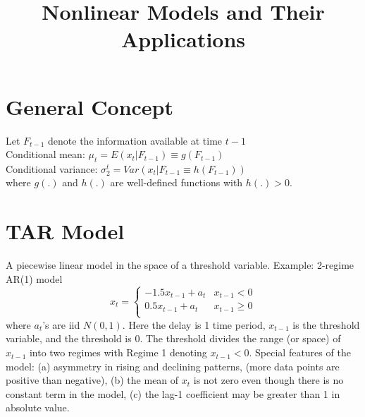 \documentclass[12pt, titlepage]{article}
\title{Nonlinear Models and Their Applications}
\begin{document}
	\maketitle
\section{General Concept}
Let $F_{t-1}$ denote the information available at time $t-1$\\
Conditional mean: $\mu_{t}=E(x_{t}|F_{t-1})\equiv g(F_{t-1})$\\
Conditional variance: $\sigma_{2}^{t}=Var(x_{t}|F_{t-1}\equiv h(F_{t-1}))$\\
where $g(.)$ and $h(.)$ are well-defined functions with $h(.)>0$.

\section{TAR Model} 
A piecewise linear model in the space of a threshold
variable.
Example: 2-regime AR(1) model
$$ x_{t}=\begin{cases}
-1.5x_{t-1}+a_{t} & x_{t-1}<0 \\
0.5x_{t-1}+a_{t} & x_{t-1}\geq0 \\
\end{cases}$$
where $a_{t}$'s are iid $N(0,1)$.
Here the delay is 1 time period, $x_{t-1}$ is the threshold variable, and the threshold is 0. The threshold divides the range (or space) of $x_{t-1}$ into two regimes with Regime 1 denoting $x_{t-1}<0$.
Special features of the model: (a) asymmetry in rising and declining patterns, (more data points are positive than negative), (b) the mean of $x_{t}$ is not zero even though there is no constant term in the model, (c) the lag-1 coefficient may be greater than 1 in absolute value.   
\end{document}
